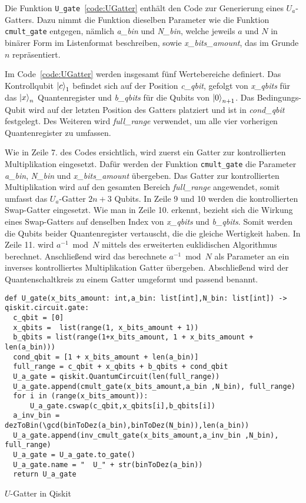 Die Funktion \texttt{U\_gate}~\ref{code:UGatter} enthält den Code zur Generierung eines \(U_a\)-Gatters.
Dazu nimmt die Funktion dieselben Parameter wie die Funktion \texttt{cmult\_gate} entgegen, 
nämlich  \textit{a\_bin} und \textit{N\_bin}, welche jeweils \(a\) und \(N\) in binärer Form im Listenformat beschreiben,  
sowie \textit{x\_bits\_amount}, das im Grunde \(n\) repräsentiert.

Im Code~\ref{code:UGatter} werden insgesamt fünf Wertebereiche definiert.
Das Kontrollqubit \(\ket{c}_1\) befindet sich auf der Position \textit{c\_qbit},
gefolgt von \textit{x\_qbits} für das \(\ket{x}_{n}\) Quantenregister und  
\textit{b\_qbits} für die Qubits von \(\ket{0}_{n+1}\).
Das Bedingungs-Qubit wird auf der letzten Position des Gatters platziert und  
ist in \textit{cond\_qbit} festgelegt.
Des Weiteren wird \textit{full\_range} verwendet,
um alle vier vorherigen Quantenregister zu umfassen.

Wie in Zeile 7. des Codes ersichtlich, wird zuerst ein Gatter zur kontrollierten Multiplikation eingesetzt.
Dafür werden der Funktion \texttt{cmult\_gate} die Parameter \textit{a\_bin}, \textit{N\_bin} und \textit{x\_bits\_amount} übergeben.
Das Gatter zur kontrollierten Multiplikation wird auf den gesamten Bereich \textit{full\_range} angewendet, 
somit umfasst das \(U_a\)-Gatter \(2n+3\) Qubits.
In Zeile 9 und 10 werden die kontrollierten Swap-Gatter eingesetzt.
Wie man in Zeile 10. erkennt, bezieht sich die Wirkung eines Swap-Gatters auf denselben Index von \textit{x\_qbits} und \textit{b\_qbits}.
Somit werden die Qubits beider Quantenregister vertauscht, die die gleiche Wertigkeit haben.
In Zeile 11. wird \(a^{-1}\bmod N\) mittels des erweiterten euklidischen Algorithmus berechnet.
Anschließend wird das berechnete \(a^{-1}\bmod N\) als Parameter an ein inverses kontrolliertes Multiplikation Gatter übergeben.
Abschließend wird der Quantenschaltkreis zu einem Gatter umgeformt und passend benannt.

\begin{listing}[H]
\begin{verbatim}  
def U_gate(x_bits_amount: int,a_bin: list[int],N_bin: list[int]) -> qiskit.circuit.gate:  
  c_qbit = [0]
  x_qbits =  list(range(1, x_bits_amount + 1))
  b_qbits = list(range(1+x_bits_amount, 1 + x_bits_amount + len(a_bin)))
  cond_qbit = [1 + x_bits_amount + len(a_bin)]
  full_range = c_qbit + x_qbits + b_qbits + cond_qbit
  U_a_gate = qiskit.QuantumCircuit(len(full_range))
  U_a_gate.append(cmult_gate(x_bits_amount,a_bin ,N_bin), full_range)
  for i in (range(x_bits_amount)):
      U_a_gate.cswap(c_qbit,x_qbits[i],b_qbits[i])
  a_inv_bin = dezToBin(\gcd(binToDez(a_bin),binToDez(N_bin)),len(a_bin))
  U_a_gate.append(inv_cmult_gate(x_bits_amount,a_inv_bin ,N_bin), full_range)
  U_a_gate = U_a_gate.to_gate()
  U_a_gate.name = "  U_" + str(binToDez(a_bin))
  return U_a_gate
  \end{verbatim}
  \caption{\(U\)-Gatter in Qiskit}
  \label{code:UGatter}
\end{listing}

